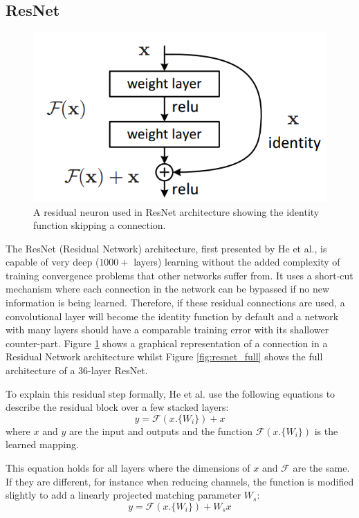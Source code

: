 \documentclass[fleqn,twoside,12pt]{report}
\begin{document}
\subsection{ResNet}
\label{sec:resnet}


\begin{figure}[h]
	\centering
	\includegraphics[width=0.7\linewidth]{residual_neuron.png}
	\caption{A residual neuron used in ResNet architecture showing the identity function skipping a connection.}
	\label{fig:residual}
\end{figure}

The ResNet (Residual Network) architecture, first presented by He et al.\cite{he}, is capable of very deep ($1000+$ layers) learning without the added complexity of training convergence problems that other networks suffer from. It uses a short-cut mechanism where each connection in the network can be bypassed if no new information is being learned. Therefore, if these residual connections are used, a convolutional layer will become the identity function by default and a network with many layers should have a comparable training error with its shallower counter-part. Figure \ref{fig:residual} shows a graphical representation of a connection in a Residual Network architecture whilst Figure \ref{fig:resnet_full} shows the full architecture of a $36$-layer ResNet.


To explain this residual step formally, He et al.\cite{he} use the following equations to describe the residual block over a few stacked layers:
\begin{equation}
y = \mathcal{F}(x.\{W_i\}) + x
\end{equation}
where $x$ and $y$ are the input and outputs and the function $\mathcal{F}(x.\{W_i\})$ is the learned mapping. 

This equation holds for all layers where the dimensions of $x$ and $\mathcal{F}$ are the same. If they are different, for instance when reducing channels, the function is modified slightly to add a linearly projected matching parameter $W_s$:
\begin{equation}
y = \mathcal{F}(x.\{W_i\}) + W_s x
\end{equation}
\end{document}
